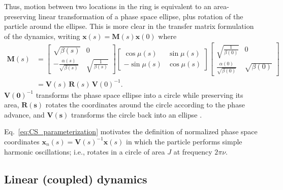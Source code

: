 Thus, motion between two locations in the ring is equivalent to an area-preserving linear transformation of a phase space ellipse, plus rotation of the particle around the ellipse. This is more clear in the transfer matrix formulation of the dynamics, writing $\mathbf{x}(s) = \mathbf{M}(s)\mathbf{x}(0)$ where
%
\begin{equation} \label{eq:CS_parameterization}
\begin{aligned}
    \mathbf{M}(s) &= 
    \begin{bmatrix} 
        \sqrt{\beta(s)} & 0 \\
        -\frac{\alpha(s)}{\sqrt{\beta(s)}} & \sqrt{\frac{1}{\beta(s)}}
    \end{bmatrix}
    \begin{bmatrix} 
        \cos\mu(s) & \sin\mu(s) 
        \\ -\sin\mu(s) & \cos\mu(s) 
    \end{bmatrix}
    \begin{bmatrix} 
        \sqrt{\frac{1}{\beta(0)}} & 0 \\
        \frac{\alpha(0)}{\sqrt{\beta(0)}} & \sqrt{\beta(0)}
    \end{bmatrix} \\
    &= \mathbf{V}(s) \, \mathbf{R}(s) \, \mathbf{V}(0)^{-1}. 
\end{aligned}
\end{equation}
%
$\mathbf{V(0)}^{-1}$ transforms the phase space ellipse into a circle while preserving its area, $\mathbf{R(s)}$ rotates the coordinates around the circle according to the phase advance, and $\mathbf{V(s)}$ transforms the circle back into an ellipse \cite{Lee2011}. 

Eq.~\eqref{eq:CS_parameterization} motivates the definition of normalized phase space coordinates $\mathbf{x}_n(s) = \mathbf{V}(s)^{-1} \mathbf{x}(s)$ in which the particle performs simple harmonic oscillations; i.e., rotates in a circle of area $J$ at frequency $2\pi\nu$. 


\subsection{Linear (coupled) dynamics}

